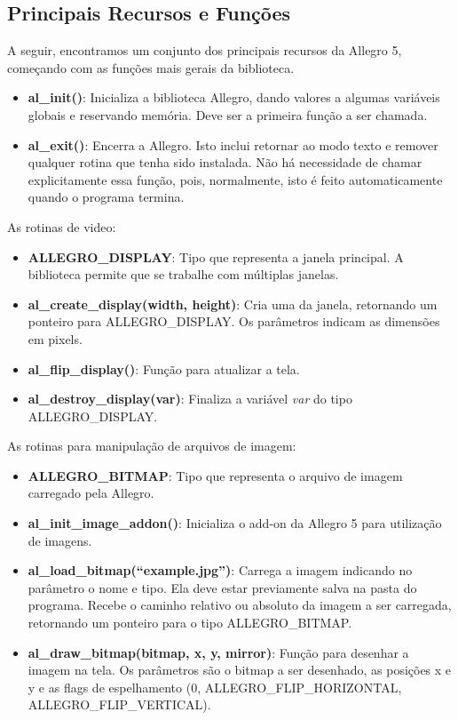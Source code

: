 \documentclass[a4paper,12pt]{report}
\begin{document}
\subsection{Principais Recursos e Funções}
%
A seguir, encontramos um conjunto dos principais recursos da Allegro 5, começando com
as funções mais gerais da biblioteca.
%
\begin{itemize}
 \item \textbf{al\_init()}: Inicializa a biblioteca Allegro, dando valores a algumas variáveis globais e reservando memória. 
 Deve ser a primeira função a ser chamada.
 \item \textbf{al\_exit()}: Encerra a Allegro. Isto inclui retornar ao modo texto e remover qualquer rotina que tenha sido instalada. 
 Não há necessidade de chamar explicitamente essa função, pois, normalmente, isto é feito automaticamente quando o programa termina.
\end{itemize}
%
As rotinas de video:
%
\begin{itemize}
 \item \textbf{ALLEGRO\_DISPLAY}: Tipo que representa a janela principal. A biblioteca permite que se trabalhe com múltiplas janelas.
 \item \textbf{al\_create\_display(width, height)}: Cria uma da janela, retornando um ponteiro para ALLEGRO\_DISPLAY. Os parâmetros indicam as 
 dimensões em pixels.
 \item \textbf{al\_flip\_display()}: Função para atualizar a tela.
 \item \textbf{al\_destroy\_display(var)}: Finaliza a variável \textit{var} do tipo ALLEGRO\_DISPLAY\*.
\end{itemize}
%
As rotinas para manipulação de arquivos de imagem:
%
\begin{itemize}
 \item \textbf{ALLEGRO\_BITMAP}: Tipo que representa o arquivo de imagem carregado pela Allegro.
 \item \textbf{al\_init\_image\_addon()}: Inicializa o add-on da Allegro 5 para utilização de imagens.
 \item \textbf{al\_load\_bitmap(``example.jpg'')}: Carrega a imagem indicando no parâmetro o nome e tipo. Ela deve estar previamente salva na pasta 
 do programa. Recebe o caminho relativo ou absoluto da imagem a ser carregada, retornando um ponteiro para o tipo ALLEGRO\_BITMAP.
 \item \textbf{al\_draw\_bitmap(bitmap, x, y, mirror)}: Função para desenhar a imagem na tela. Os parâmetros são o bitmap a ser desenhado, as 
 posições x e y e as flags de espelhamento (0, ALLEGRO\_FLIP\_HORIZONTAL, ALLEGRO\_FLIP\_VERTICAL).
\end{itemize}
\end{document}
